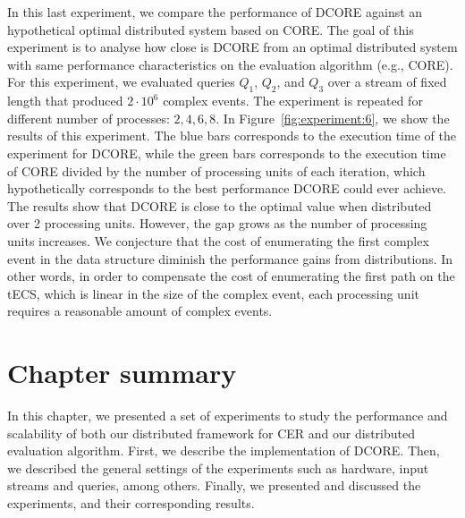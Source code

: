 In this last experiment, we compare the performance of DCORE against an hypothetical optimal distributed system based on CORE. The goal of this experiment is to analyse how close is DCORE from an optimal distributed system with same performance characteristics on the evaluation algorithm (e.g., CORE). For this experiment, we evaluated queries $Q_{1}$, $Q_{2}$, and $Q_{3}$ over a stream of fixed length that produced $2 \cdot 10^{6}$ complex events. The experiment is repeated for different number of processes: $2, 4, 6, 8$. In Figure~\ref{fig:experiment:6}, we show the results of this experiment. The blue bars corresponds to the execution time of the experiment for DCORE, while the green bars corresponds to the execution time of CORE divided by the number of processing units of each iteration, which hypothetically corresponds to the best performance DCORE could ever achieve. The results show that DCORE is close to the optimal value when distributed over 2 processing units. However, the gap grows as the number of processing units increases. We conjecture that the cost of enumerating the first complex event in the data structure diminish the performance gains from distributions. In other words, in order to compensate the cost of enumerating the first path on the tECS, which is linear in the size of the complex event, each processing unit requires a reasonable amount of complex events.

\section{Chapter summary}

In this chapter, we presented a set of experiments to study the performance and scalability of both our distributed framework for CER and our distributed evaluation algorithm. First, we describe the implementation of DCORE. Then, we described the general settings of the experiments such as hardware, input streams and queries, among others. Finally, we presented and discussed the experiments, and their corresponding results.

